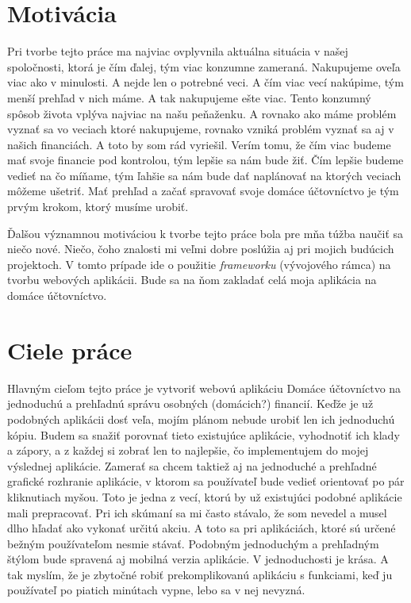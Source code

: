 \documentclass[12pt]{book}
\begin{document}
\section{Motivácia}
Pri tvorbe tejto práce ma najviac ovplyvnila aktuálna situácia v našej spoločnosti, ktorá je čím ďalej, tým viac konzumne zameraná. Nakupujeme oveľa viac ako v minulosti. A nejde len o potrebné veci. A čím viac vecí nakúpime, tým menší prehľad v nich máme. A tak nakupujeme ešte viac. Tento konzumný spôsob života vplýva najviac na našu peňaženku. A rovnako ako máme problém vyznať sa vo veciach ktoré nakupujeme, rovnako vzniká problém vyznať sa aj v našich financiách. A toto by som rád vyriešil. Verím tomu, že čím viac budeme mať svoje financie pod kontrolou, tým lepšie sa nám bude žiť. Čím lepšie budeme vedieť na čo míňame, tým ľahšie sa nám bude dať naplánovať na ktorých veciach môžeme ušetriť. Mať prehľad a začať spravovať svoje domáce účtovníctvo je tým prvým krokom, ktorý musíme urobiť.

Ďalšou významnou motiváciou k tvorbe tejto práce bola pre mňa túžba naučiť sa niečo nové. Niečo, čoho znalosti mi veľmi dobre poslúžia aj pri mojich budúcich projektoch. V tomto prípade ide o použitie \emph{frameworku} (vývojového rámca) na tvorbu webových aplikácii. Bude sa na ňom zakladať celá moja aplikácia na domáce účtovníctvo.   

\section{Ciele práce}
Hlavným cieľom tejto práce je vytvoriť webovú aplikáciu Domáce účtovníctvo na jednoduchú a prehľadnú správu osobných (domácich?) financií. Keďže je už podobných aplikácii dosť veľa, mojím plánom nebude urobiť len ich jednoduchú kópiu. Budem sa snažiť porovnať tieto existujúce aplikácie, vyhodnotiť ich klady a zápory, a z každej si zobrať len to najlepšie, čo implementujem do mojej výslednej aplikácie. Zamerať sa chcem taktiež aj na jednoduché a prehľadné grafické rozhranie aplikácie, v ktorom sa používateľ bude vedieť orientovať po pár kliknutiach myšou. Toto je jedna z vecí, ktorú by už existujúci podobné aplikácie mali prepracovať. Pri ich skúmaní sa mi často stávalo, že som nevedel a musel dlho hľadať ako vykonať určitú akciu. A toto sa pri aplikáciách, ktoré sú určené bežným používateľom nesmie stávať. Podobným jednoduchým a prehľadným štýlom bude spravená aj mobilná verzia aplikácie. V jednoduchosti je krása. A tak myslím, že je zbytočné robiť prekomplikovanú aplikáciu s  funkciami, keď ju používateľ po piatich minútach vypne, lebo sa v nej nevyzná.
\end{document}
